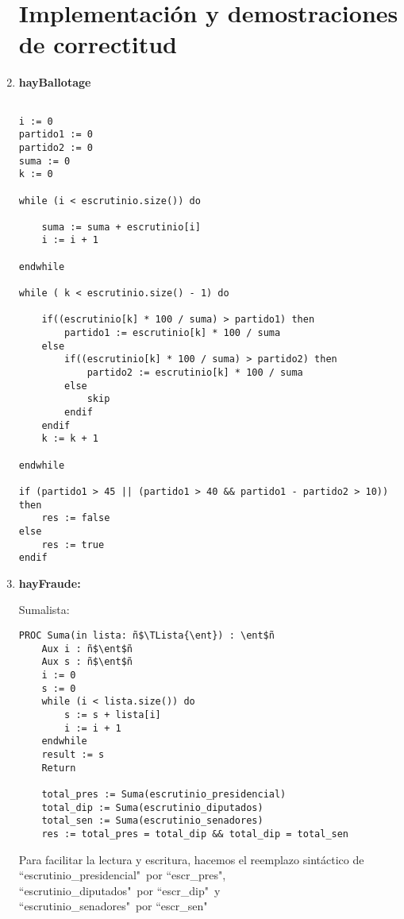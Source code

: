 \documentclass[10pt,a4paper]{article}
\begin{document}
\begin{enumerate}

\section{Implementación y demostraciones de correctitud}
\item \textbf{hayBallotage}
\begin{lstlisting}

i := 0
partido1 := 0
partido2 := 0
suma := 0
k := 0

while (i < escrutinio.size()) do

    suma := suma + escrutinio[i]
    i := i + 1
    
endwhile

while ( k < escrutinio.size() - 1) do

    if((escrutinio[k] * 100 / suma) > partido1) then
        partido1 := escrutinio[k] * 100 / suma
    else
        if((escrutinio[k] * 100 / suma) > partido2) then
            partido2 := escrutinio[k] * 100 / suma
        else
            skip
        endif
    endif
    k := k + 1
    
endwhile

if (partido1 > 45 || (partido1 > 40 && partido1 - partido2 > 10)) then
    res := false
else
    res := true
endif
\end{lstlisting}
\newpage

\item \textbf{hayFraude:}
\begin{proc}{Suma}{\In lista: \TLista{\ent}}{\ent}
    \requiere{\True}
\end{proc}
\begin{lstlisting}[escapechar=ñ]
    PROC Suma(in lista: ñ$\TLista{\ent}) : \ent$ñ
    Aux i : ñ$\ent$ñ
    Aux s : ñ$\ent$ñ
    i := 0
    s := 0
    while (i < lista.size()) do
        s := s + lista[i]
        i := i + 1
    endwhile
    result := s
    Return
    
    total_pres := Suma(escrutinio_presidencial)
    total_dip := Suma(escrutinio_diputados)
    total_sen := Suma(escrutinio_senadores)
    res := total_pres = total_dip && total_dip = total_sen
\end{lstlisting}

Para facilitar la lectura y escritura, hacemos el reemplazo sintáctico de\\ ``escrutinio\_presidencial"\ por ``escr\_pres",\\ ``escrutinio\_diputados"\ por ``escr\_dip"\ y\\ ``escrutinio\_senadores"\ por ``escr\_sen"
\vspace*{1em}


\end{enumerate}
\end{document}
